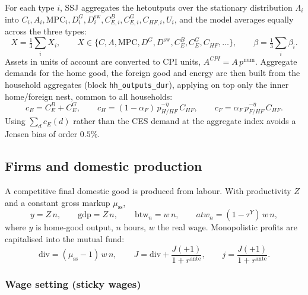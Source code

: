 \documentclass[11pt,a4paper]{article}
\newcommand{\num}{\mathrm{num}}
\newcommand{\stst}{\mathrm{ss}}
\newcommand{\dsw}{D^{\mathrm{sw}}}
\newcommand{\DG}{D^{G}}
\begin{document}
For each type $i$, SSJ aggregates the hetoutputs over the stationary
distribution $\Lambda_i$ into $C_i,A_i,\mathrm{MPC}_i,\DG_i,\dsw_i,
C^{B}_{E,i},C^{G}_{E,i},C_{HF,i},U_i$, and the model averages equally across the
three types:
\begin{equation}
X=\tfrac13\textstyle\sum_i X_i,\qquad
X\in\{C,A,\mathrm{MPC},\DG,\dsw,C^{B}_{E},C^{G}_{E},C_{HF},\ldots\},
\qquad \beta=\tfrac13\textstyle\sum_i\beta_i .
\end{equation}
Assets in units of account are converted to CPI units, $A^{CPI}=A\,p^{\num}$.
Aggregate demands for the home good, the foreign good and energy are then built
from the household aggregates (block \texttt{hh\_outputs\_dur}), applying on top
only the inner home/foreign nest, common to all households:
\begin{equation}
c_E = C^{B}_{E}+C^{G}_{E},\qquad
c_H = (1-\alpha_F)\,p_{H/HF}^{-\eta}\,C_{HF},\qquad
c_F = \alpha_F\,p_{F/HF}^{-\eta}\,C_{HF}. \label{eq:cHcF}
\end{equation}
Using $\sum_d c_E(d)$ rather than the CES demand at the aggregate index avoids a
Jensen bias of order $0.5\%$.

\subsection{Firms and domestic production}\label{sec:firms}

A competitive final domestic good is produced from labour. With productivity $Z$
and a constant gross markup $\mu_{\stst}$,
\begin{equation}
y = Z\,n,\qquad
\mathrm{gdp}=Z\,n,\qquad
\text{btw}_n = w\,n,\qquad
atw_n = (1-\tau^{Y})\,w\,n,
\end{equation}
where $y$ is home-good output, $n$ hours, $w$ the real wage. Monopolistic
profits are capitalised into the mutual fund:
\begin{equation}
\mathrm{div}=(\mu_{\stst}-1)\,w\,n,\qquad
J=\mathrm{div}+\frac{J(+1)}{1+r^{\text{ante}}},\qquad
j=\frac{J(+1)}{1+r^{\text{ante}}}.
\end{equation}

\subsubsection{Wage setting (sticky wages)}\label{sec:union}
\end{document}
